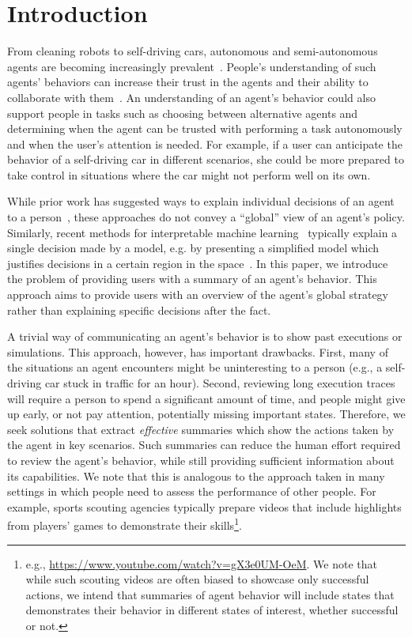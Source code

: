 \section{Introduction}
From cleaning robots to self-driving cars, autonomous and semi-autonomous agents are becoming increasingly prevalent~\cite{stone2016artificial}. People's understanding of such agents' behaviors can increase their trust in the agents and their ability to collaborate with them~\cite{devin2016implemented,glass2008toward}. An understanding of an agent's behavior could also support people in tasks such as choosing between alternative agents and determining when the agent can be trusted with performing a task autonomously and when the user's attention is needed. For example, if a user can anticipate the behavior of  a self-driving car in different scenarios, she could be more prepared to take control in situations where the car might not perform well on its own.

While prior work has suggested ways to explain individual decisions of an agent to a person~\cite{khan2009minimal,khan2011automatically}, these approaches do not convey a ``global'' view of an agent's policy. Similarly, recent methods for interpretable machine learning~\cite{vellido2012making,doshi2017towards} typically explain a single decision made by a model, e.g. by presenting a simplified model which justifies decisions in a certain region in the space~\cite{ribeiro2016model}. In this paper, we introduce the problem of providing users with a summary of an agent's behavior. This approach aims to provide users with an overview of the agent's global strategy rather than explaining specific decisions  after the fact. 

A trivial way of communicating an agent's behavior is to show past executions or simulations. This approach, however, has important drawbacks. First, many of the situations an agent encounters might be uninteresting to a person (e.g., a self-driving car stuck in traffic for an hour). Second, reviewing long execution traces will require a person to spend a significant amount of time, and people might give up early, or not pay attention, potentially missing important states. Therefore, we seek solutions that extract \emph{effective} summaries which show the actions taken by the agent in key scenarios. Such summaries can reduce the human effort required to review the agent's behavior, while still providing sufficient information about its capabilities. We note that this is analogous to the approach taken in many settings in which people need to assess the performance of other people. For example, sports scouting agencies typically prepare videos that include highlights from players' games to demonstrate their skills\footnote{e.g.,  \url{https://www.youtube.com/watch?v=gX3e0UM-OeM}. We note that while such scouting videos are often biased to showcase only successful actions, we intend that summaries of agent behavior will include states that demonstrates their behavior in different states of interest, whether successful or not.}.  

